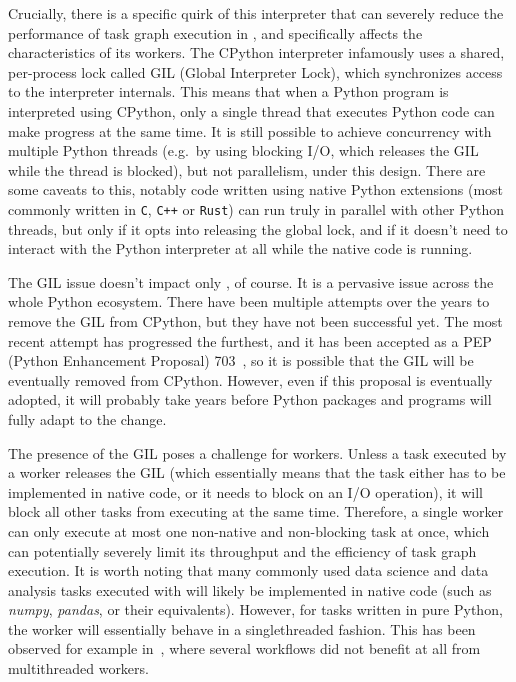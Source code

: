 Crucially, there is a specific quirk of this interpreter that can severely reduce the performance
of task graph execution in \dask{}, and specifically affects the characteristics of
its workers. The CPython interpreter infamously uses a shared, per-process lock called GIL (Global
Interpreter Lock), which synchronizes access to the interpreter internals. This means that when a
Python program is interpreted using CPython, only a single thread that executes Python code can
make progress at the same time. It is still possible to achieve concurrency with multiple Python
threads (e.g.\ by using blocking I/O, which releases the GIL while the thread is blocked), but not
parallelism, under this design. There are some caveats to this, notably code written using native
Python extensions (most commonly written in \texttt{C}, \texttt{C++} or
\texttt{Rust}) can run truly in parallel with other Python threads, but only if it opts
into releasing the global lock, and if it doesn't need to interact with the Python interpreter at
all while the native code is running.

The GIL issue doesn't impact only \dask{}, of course. It is a pervasive issue
across the whole Python ecosystem. There have been multiple attempts over the years to remove the
GIL from CPython, but they have not been successful yet. The most recent attempt has progressed the
furthest, and it has been accepted as a PEP (Python Enhancement Proposal)
703~\cite{pep703}, so it is possible that the GIL will be eventually removed from
CPython. However, even if this proposal is eventually adopted, it will probably take years before
Python packages and programs will fully adapt to the change.

The presence of the GIL poses a challenge for \dask{} workers. Unless a task
executed by a worker releases the GIL (which essentially means that the task either has to be
implemented in native code, or it needs to block on an I/O operation), it will block all other
tasks from executing at the same time. Therefore, a single \dask{} worker can only
execute at most one non-native and non-blocking task at once, which can potentially severely limit
its throughput and the efficiency of task graph execution. It is worth noting that many commonly
used data science and data analysis tasks executed with \dask{} will likely be
implemented in native code (such as \emph{numpy}, \emph{pandas}, or their
\dask{} equivalents). However, for tasks written in pure Python, the worker will
essentially behave in a singlethreaded fashion. This has been observed for example
in~\cite{dasksparkcomparison}, where several workflows did not benefit at all from multithreaded
\dask{} workers.

